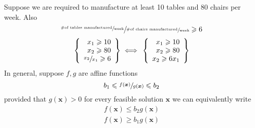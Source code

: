 \begin{exbox}
    \begin{example}
        Suppose we are required to manufacture at least 10 tables and
        80 chairs per week. Also
        \[\sfrac{\sfrac{\text{\#of tables manufactured}}{\text{week}}}
            {\sfrac{\text{\#of chairs manufactured}}{\text{week}}}
            \geqslant  6\]
        \[
            \left\{\begin{array}{r}
                x_1\geqslant  10 \\
                x_2\geqslant  80 \\
                \sfrac{x_2}{x_1}\geqslant  6
            \end{array}\right\}
            \iff{}
            \left\{\begin{array}{r}
                x_1\geqslant  10 \\
                x_2\geqslant  80 \\
                x_2\geqslant  6x_1
            \end{array}\right\}
        \]
        In general, suppose $f,g$ are affine functions
        \[
            b_1\leqslant \sfrac{f(\bm{x})}{g(\bm{x})}\leqslant b_2
        \]
        provided that $g(\bm{x})>0$ for every feasible solution $\bm{x}$ we
        can equivalently write
        \begin{align*}
            f(\bm{x})\leqslant b_2 g(\bm{x}) \\
            f(\bm{x})\geqslant  b_1 g(\bm{x})
        \end{align*}
    \end{example}
\end{exbox}


